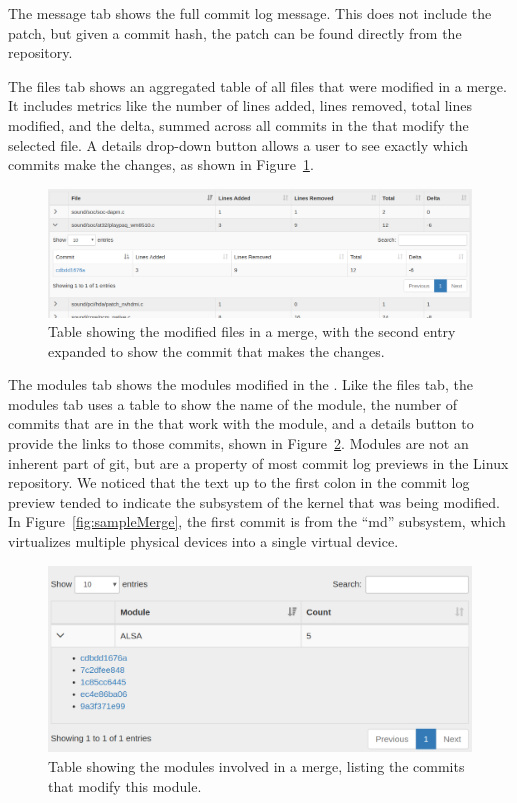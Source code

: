 The message tab shows the full commit log message. This does not include
the patch, but given a commit hash, the patch can be found directly from
the repository.

The files tab shows an aggregated table of all files that were modified
in a merge. It includes metrics like the number of lines added, lines
removed, total lines modified, and the delta, summed across all commits
in the \mt{} that modify the selected file. A details drop-down button
allows a user to see exactly which commits make the changes, as shown in
Figure~\ref{fig:linvis_files_results}.

\begin{figure}[htpb]
  \centering
  \includegraphics[width=0.9\linewidth]{Figures/Linvis/linvis_files.png}
  \caption{Table showing the modified files in a merge, with the second
    entry expanded to show the commit that makes the changes.}
  \label{fig:linvis_files_results}
\end{figure}

The modules tab shows the modules modified in the \mt{}. Like the files
tab, the modules tab uses a table to show the name of the module, the
number of commits that are in the \mt{} that work with the module, and a
details button to provide the links to those commits, shown in
Figure~\ref{fig:linvis_modules_results}. Modules are not an inherent
part of git, but are a property of most commit log previews in the Linux
repository. We noticed that the text up to the first colon in the commit
log preview tended to indicate the subsystem of the kernel that was
being modified. In Figure~\ref{fig:sampleMerge}, the first commit is
from the ``md'' subsystem, which virtualizes multiple physical devices
into a single virtual device.

\begin{figure}[htpb]
  \centering
  \includegraphics[width=0.9\linewidth]{Figures/Linvis/linvis_modules.png}
  \caption{Table showing the modules involved in a merge, listing the
    commits that modify this module.}
  \label{fig:linvis_modules_results}
\end{figure}


